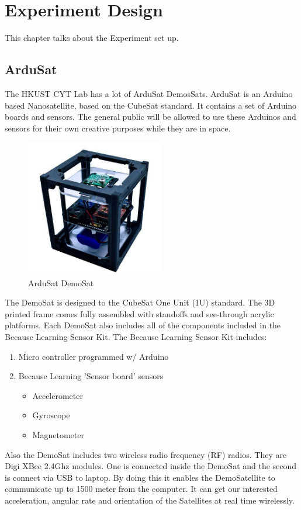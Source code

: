 \chapter{Experiment Design}\label{sec-DOE}
This chapter talks about the Experiment set up.
\section{ArduSat}
The HKUST CYT Lab has a lot of ArduSat DemosSats\cite{geeroms2015ardusat,peters2016ardusat}. ArduSat is an Arduino based Nanosatellite, based on the CubeSat standard. It contains a set of Arduino boards and sensors. The general public will be allowed to use these Arduinos and sensors for their own creative purposes while they are in space. 
\begin{figure}[ht]
\centering
\includegraphics[width=6cm]{fig/DOE/Demosat}
\caption{ArduSat DemoSat}
\end{figure}
The DemoSat is designed to the CubeSat One Unit (1U) standard. The 3D printed frame comes fully assembled with standoffs and see-through acrylic platforms. Each DemoSat also includes all of the components included in the Because Learning Sensor Kit. The Because Learning Sensor Kit includes:
\begin{enumerate}
\item Micro controller programmed w/ Arduino 
\item Because Learning 'Sensor board' sensors 
\begin{itemize}
\item Accelerometer
\item Gyroscope
\item Magnetometer
\end{itemize}
\end{enumerate} 
Also the DemoSat includes two wireless radio frequency (RF) radios. They are Digi XBee 2.4Ghz modules. One is connected inside the DemoSat and the second is connect via USB to laptop. By doing this it enables the DemoSatellite to communicate up to 1500 meter from the computer.
It can get our interested acceleration, angular rate and orientation of the Satellites at real time wirelessly.
